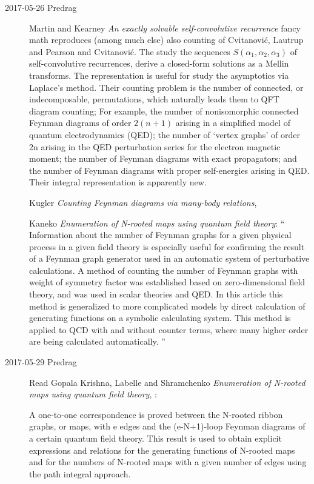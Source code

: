 \begin{description}
\item[2017-05-26 Predrag]
Martin and Kearney
{\em An exactly solvable self-convolutive recurrence} fancy math
reproduces (among much else) also counting of
Cvitanovi\'c, Lautrup and Pearson
and
Cvitanovi\'c.
The study the sequences $S(\alpha_1, \alpha_2, \alpha_3)$ of
self-convolutive recurrences, derive a closed-form solutions as a Mellin
transforms.
The representation is useful for study the asymptotics via Laplace's
method. Their counting problem is the number of connected, or
indecomposable, permutations, which naturally leads them to QFT diagram
counting; For example, the number of nonisomorphic connected Feynman
diagrams of order $2(n + 1)$ arising in a simplified model of quantum
electrodynamics (QED); the number of `vertex graphs' of
order 2n arising in the QED perturbation series for the electron magnetic
moment; the number of Feynman diagrams with exact
propagators; and the number of Feynman diagrams with proper
self-energies arising in QED.
Their integral representation is apparently new.

Kugler
{\em Counting {Feynman} diagrams via many-body relations},

Kaneko
{\em Enumeration of {N}-rooted maps using quantum field theory}: ``
Information about the number of Feynman graphs for a given physical
process in a given field theory is especially useful for confirming the
result of a Feynman graph generator used in an automatic system of
perturbative calculations. A method of counting the number of Feynman
graphs with weight of symmetry factor was established based on
zero-dimensional field theory, and was used in scalar theories and QED.
In this article this method is generalized to more complicated models by
direct calculation of generating functions on a symbolic calculating
system. This method is applied to QCD with and without counter terms,
where many higher order are being calculated automatically.
''

\item[2017-05-29 Predrag] Read
 Gopala Krishna, Labelle  and Shramchenko
{\em Enumeration of {N}-rooted maps using quantum field theory},
:

A one-to-one correspondence is proved between the N-rooted ribbon graphs,
or maps, with e edges and the (e-N+1)-loop Feynman diagrams of a certain
quantum field theory. This result is used to obtain explicit expressions
and relations for the generating functions of N-rooted maps and for the
numbers of N-rooted maps with a given number of edges using the path
integral approach.


\end{description}
